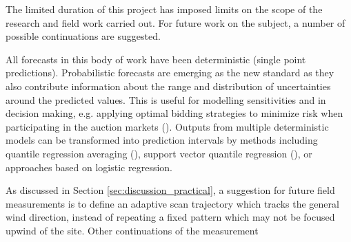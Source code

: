The limited duration of this project has imposed limits on the scope of the research and field work carried out. For future work on the subject, a number of possible continuations are suggested.

All forecasts in this body of work have been deterministic (single point predictions). Probabilistic forecasts are emerging as the new standard as they also contribute information about the range and distribution of uncertainties around the predicted values. This is useful for modelling sensitivities and in decision making, e.g. applying optimal bidding strategies to minimize risk when participating in the auction markets (\cite{pinson_trading_2007}). Outputs from multiple deterministic models can be transformed into prediction intervals by methods including quantile regression averaging (\cite{nowotarski_computing_2015}), support vector quantile regression (\cite{he_short-term_2017}), or approaches based on logistic regression.

As discussed in Section \ref{sec:discussion_practical}, a suggestion for future field measurements is to define an adaptive scan trajectory which tracks the general wind direction, instead of repeating a fixed pattern which may not be focused upwind of the site. Other continuations of the measurement 


\begin{comment}
hybrid nwp model
•	Use longer range systems
•	Combine data set with wind farm SCADA for control possibilities
Track the wind with lidar scan, fit on the fly
Volumetric wind field tracking or rhi
tune ANN model
couple with power curve like in waffle
\end{comment}